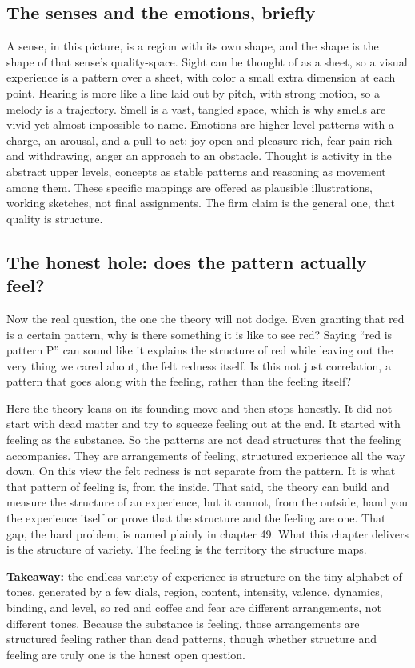 \subsection{The senses and the emotions, briefly}

A sense, in this picture, is a region with its own shape, and the shape is the shape of that sense's quality-space. Sight can be thought of as a sheet, so a visual experience is a pattern over a sheet, with color a small extra dimension at each point. Hearing is more like a line laid out by pitch, with strong motion, so a melody is a trajectory. Smell is a vast, tangled space, which is why smells are vivid yet almost impossible to name. Emotions are higher-level patterns with a charge, an arousal, and a pull to act: joy open and pleasure-rich, fear pain-rich and withdrawing, anger an approach to an obstacle. Thought is activity in the abstract upper levels, concepts as stable patterns and reasoning as movement among them. These specific mappings are offered as plausible illustrations, working sketches, not final assignments. The firm claim is the general one, that quality is structure.

\subsection{The honest hole: does the pattern actually feel?}

Now the real question, the one the theory will not dodge. Even granting that red is a certain pattern, why is there something it is like to see red? Saying ``red is pattern P'' can sound like it explains the structure of red while leaving out the very thing we cared about, the felt redness itself. Is this not just correlation, a pattern that goes along with the feeling, rather than the feeling itself?

Here the theory leans on its founding move and then stops honestly. It did not start with dead matter and try to squeeze feeling out at the end. It started with feeling as the substance. So the patterns are not dead structures that the feeling accompanies. They are arrangements of feeling, structured experience all the way down. On this view the felt redness is not separate from the pattern. It is what that pattern of feeling is, from the inside. That said, the theory can build and measure the structure of an experience, but it cannot, from the outside, hand you the experience itself or prove that the structure and the feeling are one. That gap, the hard problem, is named plainly in chapter 49. What this chapter delivers is the structure of variety. The feeling is the territory the structure maps.

\textbf{Takeaway:} the endless variety of experience is structure on the tiny alphabet of tones, generated by a few dials, region, content, intensity, valence, dynamics, binding, and level, so red and coffee and fear are different arrangements, not different tones. Because the substance is feeling, those arrangements are structured feeling rather than dead patterns, though whether structure and feeling are truly one is the honest open question.
